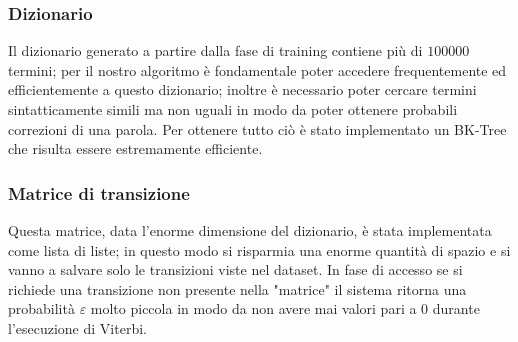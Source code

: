 \documentclass[a4paper,11pt]{article}
\begin{document}
        \subsubsection{Dizionario}
        	Il dizionario generato a partire dalla fase di training contiene più di $100000$ termini; per il nostro algoritmo è fondamentale
            poter accedere frequentemente ed efficientemente a questo dizionario; inoltre è necessario poter cercare termini sintatticamente simili ma non
            uguali in modo da poter ottenere probabili correzioni di una parola. Per ottenere tutto ciò è stato implementato un BK-Tree\cite{bktree} che risulta
            essere estremamente efficiente.
		\subsubsection{Matrice di transizione}
        	Questa matrice, data l'enorme dimensione del dizionario, è stata implementata come lista di liste; in questo modo si risparmia una enorme
            quantità di spazio e si vanno a salvare solo le transizioni viste nel dataset. In fase di accesso se si richiede una transizione non
            presente nella "matrice" il sistema ritorna una probabilità $\varepsilon$ molto piccola in modo da non avere mai valori pari a 0 durante
            l'esecuzione di Viterbi.
\end{document}
